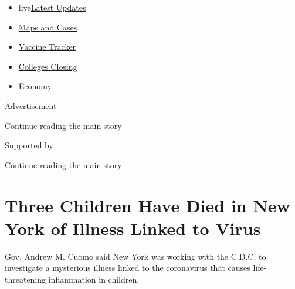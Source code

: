\begin{itemize}
\tightlist
\item
  live\href{https://www.nytimes3xbfgragh.onion/2020/08/21/world/covid-19-coronavirus.html?name=styln-coronavirus-national\&region=TOP_BANNER\&variant=undefined\&block=storyline_menu_recirc\&action=click\&pgtype=Article\&impression_id=5d883de1-e39a-11ea-a48e-b9252519409f}{Latest
  Updates}
\item
  \href{https://www.nytimes3xbfgragh.onion/interactive/2020/us/coronavirus-us-cases.html?name=styln-coronavirus-national\&region=TOP_BANNER\&variant=undefined\&block=storyline_menu_recirc\&action=click\&pgtype=Article\&impression_id=5d883de2-e39a-11ea-a48e-b9252519409f}{Maps
  and Cases}
\item
  \href{https://www.nytimes3xbfgragh.onion/interactive/2020/science/coronavirus-vaccine-tracker.html?name=styln-coronavirus-national\&region=TOP_BANNER\&variant=undefined\&block=storyline_menu_recirc\&action=click\&pgtype=Article\&impression_id=5d8864f0-e39a-11ea-a48e-b9252519409f}{Vaccine
  Tracker}
\item
  \href{https://www.nytimes3xbfgragh.onion/2020/08/19/us/colleges-closing-covid.html?name=styln-coronavirus-national\&region=TOP_BANNER\&variant=undefined\&block=storyline_menu_recirc\&action=click\&pgtype=Article\&impression_id=5d8864f1-e39a-11ea-a48e-b9252519409f}{Colleges
  Closing}
\item
  \href{https://www.nytimes3xbfgragh.onion/live/2020/08/20/business/stock-market-today-coronavirus?name=styln-coronavirus-national\&region=TOP_BANNER\&variant=undefined\&block=storyline_menu_recirc\&action=click\&pgtype=Article\&impression_id=5d8864f2-e39a-11ea-a48e-b9252519409f}{Economy}
\end{itemize}

Advertisement

\protect\hyperlink{after-top}{Continue reading the main story}

Supported by

\protect\hyperlink{after-sponsor}{Continue reading the main story}

\hypertarget{three-children-have-died-in-new-york-of-illness-linked-to-virus}{%
\section{Three Children Have Died in New York of Illness Linked to
Virus}\label{three-children-have-died-in-new-york-of-illness-linked-to-virus}}

Gov. Andrew M. Cuomo said New York was working with the C.D.C. to
investigate a mysterious illness linked to the coronavirus that causes
life-threatening inflammation in children.

